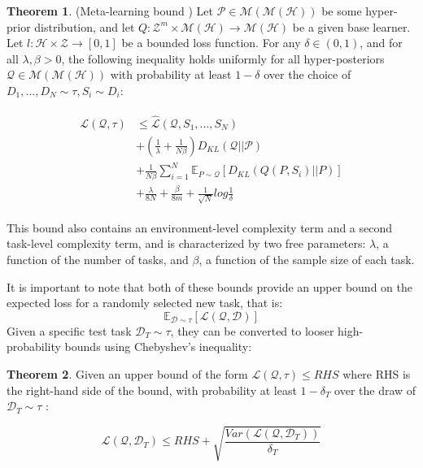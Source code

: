 \documentclass{article}
\theoremstyle{definition}
\newtheorem{theorem}{Theorem}[section]
\newcommand{\Expect}[2]{\mathbb{E}_{#1}\left [#2 \right ]}
\begin{document}
\begin{theorem} (Meta-learning bound \citep{Rothfuss2020}) \label{thm:meta-pb-rothfuss}
	Let $\mathcal{P}\in \mathcal{M}(\mathcal{M}(\mathcal{H}))$ be some hyper-prior distribution, and let $Q: \mathcal{Z}^m\times\mathcal{M}(\mathcal{H})\rightarrow \mathcal{M}(\mathcal{H})$ be a given base learner. Let $l: \mathcal{H}\times \mathcal{Z}\rightarrow [0, 1]$ be a bounded loss function.
	For any $\delta \in (0,1)$, and for all $\lambda, \beta >0$, the following inequality holds uniformly for all hyper-posteriors $\mathcal{Q}\in \mathcal{M}(\mathcal{M}(\mathcal{H}))$ with probability at least $1-\delta$ over the choice of $D_1,...,D_N\sim \tau, S_i\sim D_i$:
	
	\begin{align} \label{eq:meta-pb-rothfuss}
	\begin{split}
	\mathcal{L}(\mathcal{Q}, \tau) &\leq \hat{\mathcal{L}}(\mathcal{Q}, S_1,...,S_N) \\
	&+\left (\frac{1}{\lambda}+\frac{1}{N\beta} \right )D_{KL}(\mathcal{Q}||\mathcal{P}) \\
	&+\frac{1}{N\beta}\sum_{i=1}^{N}\Expect{P\sim \mathcal{Q}}{D_{KL}(Q(P,S_i)||P)} \\
	&+\frac{\lambda}{8N}+\frac{\beta}{8m}+\frac{1}{\sqrt{N}}log\frac{1}{\delta}
	\end{split}
	\end{align}
	
\end{theorem}

This bound also contains an environment-level complexity term and a second task-level complexity term, and is characterized by two free parameters: $\lambda$, a function of the number of tasks, and $\beta$, a function of the sample size of each task. 

It is important to note that both of these bounds provide an upper bound on the expected loss for a randomly selected new task, that is:
$$\Expect{\mathcal{D}\sim \tau}{\mathcal{L}(\mathcal{Q}, \mathcal{D})}$$
Given a specific test task $\mathcal{D}_T\sim \tau$, they can be converted to looser high-probability bounds using Chebyshev's inequality:

\begin{theorem} \label{thm:meta-highprob}
Given an upper bound of the form $\mathcal{L}(\mathcal{Q}, \tau) \leq RHS$ where RHS is the right-hand side of the bound, with probability at least $1-\delta_T$ over the draw of $\mathcal{D}_T\sim \tau$ :

$$ \mathcal{L}(\mathcal{Q}, \mathcal{D}_T) \leq RHS + \sqrt{\frac{Var(\mathcal{L}(\mathcal{Q}, \mathcal{D}_T))}{\delta_T}}$$

\end{theorem}
\end{document}
